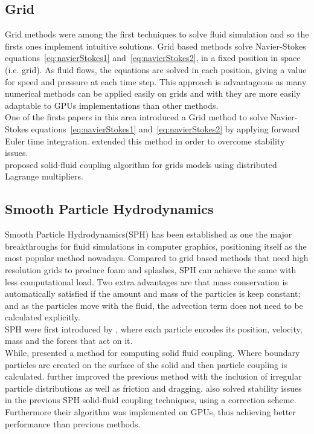 \subsection{Grid}

Grid methods were among the first techniques to solve fluid simulation and so the firsts ones implement intuitive solutions.
Grid based methods solve Navier-Stokes equations~\ref{eq:navierStokes1} and~\ref{eq:navierStokes2}, in a fixed position in space (i.e. grid).
As fluid flows, the equations are solved in each position, giving a value for speed and pressure at each time step.
This approach is advantageous as many numerical methods can be applied easily on grids and with they are more easily adaptable to GPUs implementations than other methods.\\

One of the firsts papers in this area introduced a Grid method \cite{Foster1996} to solve Navier-Stokes equations~\ref{eq:navierStokes1} and~\ref{eq:navierStokes2} by applying forward Euler time integration. 
\cite{Stam1999} extended this method in order to overcome stability issues.\\

\cite{Carlson2004} proposed solid-fluid coupling algorithm for grids models using distributed Lagrange multipliers.

\subsection{Smooth Particle Hydrodynamics}

Smooth Particle Hydrodynamics(SPH) has been established as one the major breakthroughs for fluid simulations in computer graphics, positioning itself as the most popular method nowadays.
Compared to grid based methods that need high resolution grids to produce foam and splashes, SPH can achieve the same with less computational load.
Two extra advantages are that mass conservation is automatically satisfied if the amount and mass of the particles is keep constant;
and as the particles move with the fluid, the advection term does not need to be calculated explicitly.\\

SPH were first introduced by \cite{DesbrunMathieuandGascuel1996}, where each particle encodes its position, velocity, mass and the forces that act on it.\\

While, \cite{Muller2004} presented a method for computing solid fluid coupling. Where boundary particles are created on the surface of the solid and then particle coupling is calculated.
\cite{Akinci2012} further improved the previous method with the inclusion of irregular particle distributions as well as friction and dragging. 
\cite{Shao2014} also solved stability issues in the previous SPH solid-fluid coupling techniques, using a correction scheme.
Furthermore their algorithm was implemented on GPUs, thus achieving better performance than previous methods.  

